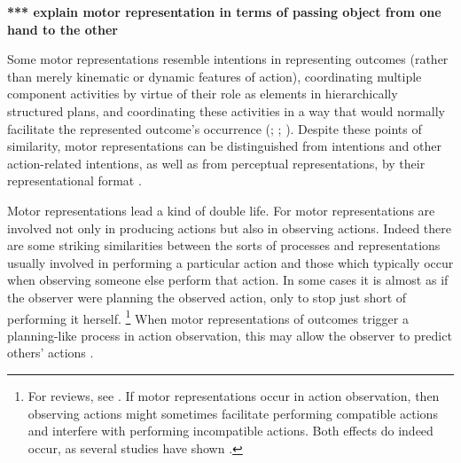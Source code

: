 \documentclass[12pt,\papersize]{extarticle}
\begin{document}
\textbf{*** explain motor representation in terms of passing object from one hand to the other}

Some motor representations resemble intentions  in 
	representing outcomes (rather than merely kinematic or dynamic features of action), 
	coordinating multiple  component activities by virtue of their role as elements in hierarchically structured plans,
	and coordinating these activities in a way that would normally facilitate the represented outcome's occurrence (\citealp{hamilton_action_2008}; \citealp[pp.\ 189-90]{pacherie:2008_action}; \citealp{butterfill:2012_intention}).
Despite these points of similarity, 
motor representations can be distinguished from intentions and other action-related intentions,
	 as well as from perceptual representations,
	 by their representational format \citep{butterfill:2012_intention}. 

Motor representations lead a kind of double life.
For motor representations are involved not only in producing actions but also in observing actions. 
Indeed there are some striking similarities between the sorts of processes and representations usually involved in performing a particular action and those which typically occur when observing someone else perform that action.
In some cases it is almost as if the observer were planning the observed action, only to stop just short of performing it herself.%
\footnote{ 
For reviews, see \citet{jeannerod_motor_2006,rizzolatti_mirrors_2008,rizzolatti_functional_2010}.
If motor representations occur in action observation, then observing actions might sometimes facilitate performing compatible actions and interfere with performing incompatible actions.  Both effects do indeed occur, as several studies have shown \citep{brass:2000_compatibility, craighero:2002_hand, kilner:2003_interference, costantini:2012_does}. 
}
When motor representations of outcomes trigger a planning-like process in action observation, this may allow the observer to predict others' actions \citep{Flanagan:2003lm,ambrosini:2011_grasping,ambrosini:2012_tie,Costantini:2012fk}.
\end{document}
